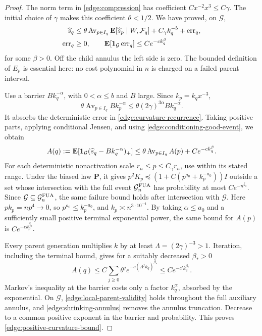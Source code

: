 \begin{proof}
The norm term in \eqref{edge:compression} has coefficient
\(Cx^{-2}x^3\le C\gamma\).  The initial choice of \(\gamma\) makes this coefficient
\(\theta<1/2\).  We have proved, on \(\mathcal G\),
\begin{equation}\label{edge:curvature-recurrence}
 \begin{split}
 \widehat s_q&\le
 \theta\operatorname{Av}_{p\in I_q}
       \mathbf E[\widehat s_p\mid W,\mathcal F_q]
       +C_\gamma k_q^{-b}+\operatorname{err}_q,\\
 \operatorname{err}_q&\ge0,\qquad
 \mathbf E[\mathbf 1_{\mathcal G}\operatorname{err}_q]
       \le C e^{-c k_q^\beta}
 \end{split}
\end{equation}
for some \(\beta>0\).  Off the child annulus the left side is zero.
The bounded definition of \(E_p\) is essential here: no cost polynomial
in \(n\) is charged on a failed parent interval.

Use a barrier \(B k_q^{-\alpha}\), with \(0<\alpha\le b\) and \(B\)
large.  Since \(k_p=k_qx^{-3}\),
\[
 \theta\operatorname{Av}_{p\in I_q}B k_p^{-\alpha}
       \le\theta(2\gamma)^{3\alpha}B k_q^{-\alpha}.
\]
It absorbs the deterministic error in
\eqref{edge:curvature-recurrence}.  Taking positive parts, applying
conditional Jensen, and using \eqref{edge:conditioning-good-event},
we obtain
\[
 A(q):=\mathbf E[\mathbf 1_{\mathcal G}
       (\widehat s_q-Bk_q^{-\alpha})_+]
 \le\theta\operatorname{Av}_{p\in I_q}A(p)+Ce^{-c k_q^\beta}.
\]
For each deterministic nonactivation scale
\(r_n\le p\le C_\gamma r_n\), use
\cite[Proposition~4.2, Equation~(4.2)]{FUA} within its stated range.
Under the biased law \(\mathbf P\), it gives
\(p^2K_p\preceq(1+C(p^{a_0}+k_p^{-a_0}))I\) outside a set whose
intersection with the full event \(\mathcal G_n^{\rm FUA}\) has
probability at most \(Ce^{-n^{\xi_0}}\).
Since \(\mathcal G\subseteq\mathcal G_n^{\rm FUA}\),
the same failure bound holds after intersection with \(\mathcal G\).
Here \(pk_p=np^4\to0\), so \(p^{a_0}\le k_p^{-a_0}\), and
\(k_p\asymp n^{3\cdot10^{-4}}\).  By taking \(\alpha\le a_0\) and a
sufficiently small positive terminal exponential power, the same bound
for \(A(p)\) is \(Ce^{-c k_p^{\beta_0}}\).

Every parent generation multiplies \(k\) by at least
\(\Lambda=(2\gamma)^{-3}>1\).  Iteration, including the terminal
bound, gives for a suitably decreased \(\beta_*>0\)
\[
 A(q)\le C\sum_{j\ge0}\theta^j
       e^{-c(\Lambda^jk_q)^{\beta_*}}
       \le C e^{-c'k_q^{\beta_*}}.
\]
Markov's inequality at the barrier costs only a factor \(k_q^\alpha\),
absorbed by the exponential.  On \(\mathcal G\),
\eqref{edge:local-parent-validity} holds throughout the full auxiliary
annulus, and
\eqref{edge:shrinking-annulus} removes the annulus truncation.
Decrease to a common positive exponent in the barrier and probability.
This proves \eqref{edge:positive-curvature-bound}.
\end{proof}

